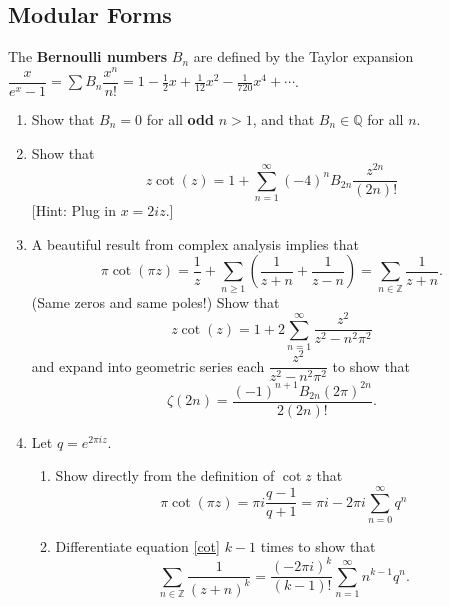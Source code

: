 \documentclass{article}
\theoremstyle{plain} %
\theoremstyle{definition}
\theoremstyle{remark}
\numberwithin{equation}{section}
\begin{document}
\subsection{Modular Forms}
The {\bf Bernoulli numbers} $B_n$ are defined by
the Taylor expansion $\displaystyle \dfrac{x}{e^x-1}=\sum B_n\dfrac{x^n}{n!}=1-\frac{1}{2}x+\frac{1}{12}x^2-\frac{1}{720}x^4+\cdots$.
\begin{enumerate}
\item Show that $B_n=0$ for all {\bf odd} $n>1$, and that
$B_n\in \mathbb{Q}$ for all $n$.
\item Show that \[z \cot(z) = 1+\sum_{n=1}^\infty (-4)^n
B_{2n}\frac{z^{2n}}{(2n)!}\] [Hint: Plug in $x=2i z$.]
\item A beautiful result from complex analysis implies that
\begin{equation}\label{cot}\pi\cot(\pi z)=\frac{1}{z}+\sum_{n\geq
  1}\left(\frac{1}{z+n}+\frac{1}{z-n}\right)=\sum_{n\in
  \mathbb{Z}}\frac{1}{z+n}.
\end{equation}
(Same zeros and same poles!)
Show that
\[z\cot(z) = 1+2\sum_{n=1}^\infty\frac{z^2}{z^2-n^2\pi^2}\]
and expand into geometric series each $\dfrac{z^2}{z^2-n^2\pi^2}$ to show that
\[\zeta(2n) =
\frac{(-1)^{n+1}B_{2n}(2\pi)^{2n}}{2(2n)!}.\]
\item Let $q=e^{2\pi i z}$.
\begin{enumerate}
\item Show directly from the definition of $\cot z$ that
\[\pi\cot(\pi z) = \pi i \frac{q-1}{q+1}=\pi i -2\pi
i\sum_{n=0}^\infty q^n\]
\item Differentiate equation \eqref{cot} $k-1$ times to show that
\[\sum_{n\in \mathbb{Z}}\frac{1}{(z+n)^k} = \frac{(-2\pi i)^k}{(k-1)!}\sum_{n=1}^\infty n^{k-1}q^n.\]
\end{enumerate}



\end{enumerate}
\newpage
\maketitle
\end{document}
